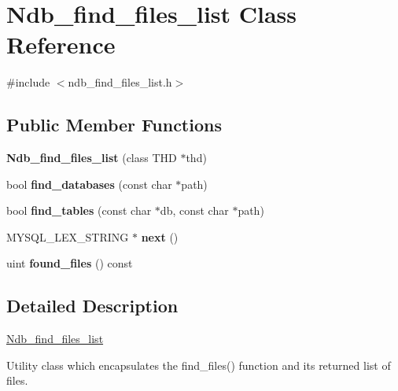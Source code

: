 \hypertarget{classNdb__find__files__list}{}\section{Ndb\+\_\+find\+\_\+files\+\_\+list Class Reference}
\label{classNdb__find__files__list}


{\ttfamily \#include $<$ndb\+\_\+find\+\_\+files\+\_\+list.\+h$>$}

\subsection*{Public Member Functions}
\begin{DoxyCompactItemize}
\item 
\mbox{\label{classNdb__find__files__list_a4f50aa562206477ba66034c2fd723317}} 
{\bfseries Ndb\+\_\+find\+\_\+files\+\_\+list} (class T\+HD $\ast$thd)
\item 
\mbox{\label{classNdb__find__files__list_a3b05b9686ea15b3095b9c6d76c48720d}} 
bool {\bfseries find\+\_\+databases} (const char $\ast$path)
\item 
\mbox{\label{classNdb__find__files__list_aeb20e75fdf0cf7bbfbcaf04548e22a56}} 
bool {\bfseries find\+\_\+tables} (const char $\ast$db, const char $\ast$path)
\item 
\mbox{\label{classNdb__find__files__list_a13dad88f534aa990eebcd02c950118e1}} 
M\+Y\+S\+Q\+L\+\_\+\+L\+E\+X\+\_\+\+S\+T\+R\+I\+NG $\ast$ {\bfseries next} ()
\item 
\mbox{\label{classNdb__find__files__list_a931b285595866ecd7aa000f63f2d8f04}} 
uint {\bfseries found\+\_\+files} () const
\end{DoxyCompactItemize}


\subsection{Detailed Description}
\mbox{\hyperlink{classNdb__find__files__list}{Ndb\+\_\+find\+\_\+files\+\_\+list}}

Utility class which encapsulates the find\+\_\+files() function and its returned list of files.

